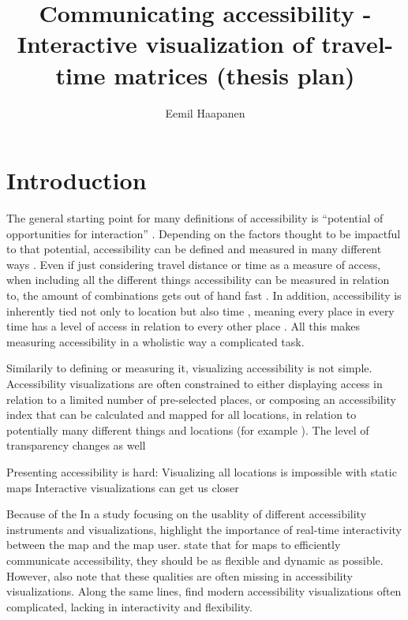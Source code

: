 \documentclass{article}
\title{Communicating accessibility - Interactive visualization of travel-time matrices (thesis  plan)}
\author{Eemil Haapanen}
\begin{document}
\maketitle

\section{Introduction}

The general starting point for many definitions of accessibility is
\enquote{potential of opportunities for interaction} \parencite{han1959}.
Depending on the factors thought to be impactful to that potential,
accessibility can be defined and measured in many different ways \parencite{pap2016}.
Even if just considering travel distance or time as a measure of access,
when including all the different things accessibility can be measured in relation to,
the amount of combinations gets out of hand fast \parencite{lev2020}.
In addition, accessibility is inherently tied not only to location
but also time \parencite{jar2018},
meaning every place in every time has a level of access
in relation to every other place \parencite{lev2020}.
All this makes measuring accessibility in a wholistic way a complicated task.

Similarily to defining or measuring it, visualizing accessibility is not simple.
Accessibility visualizations are often constrained to either
displaying access in relation to a limited number of pre-selected places,
or composing an accessibility index
that can be calculated and mapped for all locations,
in relation to potentially many different things and locations (for example \textcite{kim2019}).
The level of transparency changes as well

Presenting accessibility is hard:
Visualizing all locations is impossible with static maps
Interactive visualizations can get us closer

Because of the 
In a study focusing on the usablity of different accessibility instruments and visualizations,  %
\textcite{te2014} highlight the importance of real-time interactivity between the map and the map user.
\textcite{but2018} state that for maps to efficiently communicate accessibility,
they should be as flexible and dynamic as possible. However, \citeauthor{but2018} also note that these qualities are often missing in accessibility visualizations.
Along the same lines, \textcite{paj2021} find modern accessibility visualizations often complicated,
lacking in interactivity and flexibility.
\end{document}
